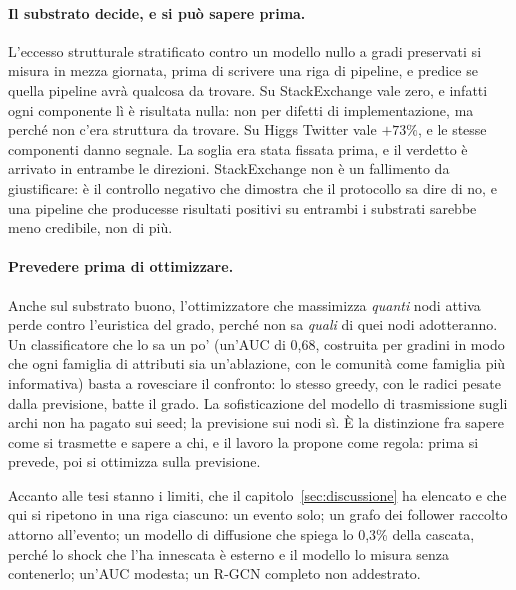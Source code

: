\documentclass[11pt,a4paper]{article}
\newcommand{\sx}{StackExchange}
\newcommand{\hg}{Higgs Twitter}
\begin{document}
\paragraph{Il substrato decide, e si può sapere prima.} L'eccesso strutturale stratificato contro un modello nullo a gradi preservati si misura in mezza giornata, prima di scrivere una riga di pipeline, e predice se quella pipeline avrà qualcosa da trovare. Su \sx{} vale zero, e infatti ogni componente lì è risultata nulla: non per difetti di implementazione, ma perché non c'era struttura da trovare. Su \hg{} vale $+73\%$, e le stesse componenti danno segnale. La soglia era stata fissata prima, e il verdetto è arrivato in entrambe le direzioni. \sx{} non è un fallimento da giustificare: è il controllo negativo che dimostra che il protocollo sa dire di no, e una pipeline che producesse risultati positivi su entrambi i substrati sarebbe meno credibile, non di più.

\paragraph{Prevedere prima di ottimizzare.} Anche sul substrato buono, l'ottimizzatore che massimizza \emph{quanti} nodi attiva perde contro l'euristica del grado, perché non sa \emph{quali} di quei nodi adotteranno. Un classificatore che lo sa un po' (un'AUC di 0,68, costruita per gradini in modo che ogni famiglia di attributi sia un'ablazione, con le comunità come famiglia più informativa) basta a rovesciare il confronto: lo stesso greedy, con le radici pesate dalla previsione, batte il grado. La sofisticazione del modello di trasmissione sugli archi non ha pagato sui seed; la previsione sui nodi sì. È la distinzione fra sapere come si trasmette e sapere a chi, e il lavoro la propone come regola: prima si prevede, poi si ottimizza sulla previsione.

Accanto alle tesi stanno i limiti, che il capitolo~\ref{sec:discussione} ha elencato e che qui si ripetono in una riga ciascuno: un evento solo; un grafo dei follower raccolto attorno all'evento; un modello di diffusione che spiega lo 0,3\% della cascata, perché lo shock che l'ha innescata è esterno e il modello lo misura senza contenerlo; un'AUC modesta; un R-GCN completo non addestrato.
\end{document}

